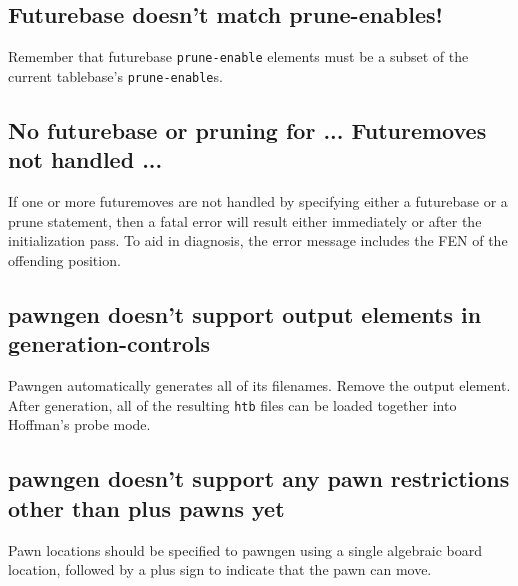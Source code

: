 \documentclass[11pt]{article}
\begin{document}
\subsection{Futurebase doesn't match prune-enables!}

Remember that futurebase {\tt prune-enable} elements must be a
subset of the current tablebase's {\tt prune-enable}s.


\subsection{No futurebase or pruning for ... \hfil\break Futuremoves not handled ...}

If one or more futuremoves are not handled by specifying either a
futurebase or a prune statement, then a fatal error will result either
immediately or after the initialization pass.  To aid in diagnosis,
the error message includes the FEN of the offending position.

\subsection{pawngen doesn't support output elements in generation-controls}

Pawngen automatically generates all of its filenames.  Remove the
output element.  After generation, all of the resulting {\tt htb}
files can be loaded together into Hoffman's probe mode.

\subsection{pawngen doesn't support any pawn restrictions other than plus pawns yet}

Pawn locations should be specified to pawngen using a single algebraic
board location, followed by a plus sign to indicate that the pawn can
move.
\end{document}
